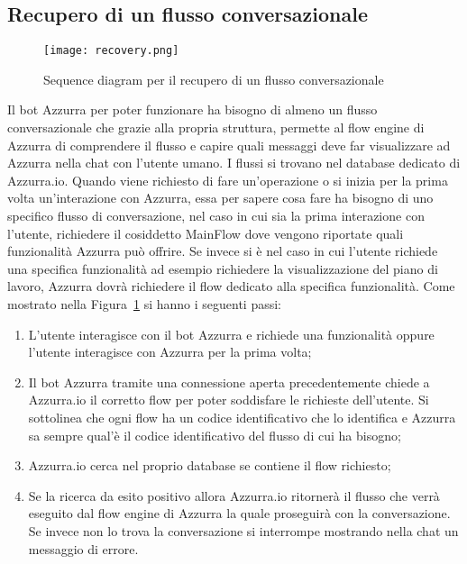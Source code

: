 \subsection{Recupero di un flusso conversazionale}
\begin{figure}[h]
	\begin{center}
		\texttt{[image: recovery.png]}
		\caption{Sequence diagram per il recupero di un flusso conversazionale}\label{fig:recovery}
	\end{center}
\end{figure}
Il bot Azzurra per poter funzionare ha bisogno di almeno un flusso conversazionale che grazie alla propria struttura, permette al flow engine di Azzurra di comprendere il flusso e capire quali messaggi deve far visualizzare ad Azzurra nella chat con l'utente umano. I flussi si trovano nel database dedicato di Azzurra.io. Quando viene richiesto di fare un’operazione o si inizia per la prima volta un'interazione con Azzurra, essa per sapere cosa fare ha bisogno di uno specifico flusso di conversazione, nel caso in cui sia la prima interazione con l'utente, richiedere il cosiddetto MainFlow dove vengono riportate quali funzionalità Azzurra può offrire. Se invece si è nel caso in cui l'utente richiede una specifica funzionalità ad esempio richiedere la visualizzazione del piano di lavoro, Azzurra dovrà richiedere il flow dedicato alla specifica funzionalità.
Come mostrato nella Figura~\ref{fig:recovery} si hanno i seguenti passi:
\begin{enumerate}
\item L'utente interagisce con il bot Azzurra e richiede una funzionalità oppure l'utente interagisce con Azzurra per la prima volta;
\item Il bot Azzurra tramite una connessione aperta precedentemente chiede a Azzurra.io il corretto flow per poter soddisfare le richieste dell'utente. Si sottolinea che ogni flow ha un codice identificativo che lo identifica e Azzurra sa sempre qual'è il codice identificativo del flusso di cui ha bisogno;
\item Azzurra.io cerca nel proprio database se contiene il flow richiesto;
\item Se la ricerca da esito positivo allora Azzurra.io ritornerà il flusso che verrà eseguito dal flow engine di Azzurra la quale proseguirà con la conversazione. Se invece non lo trova la conversazione si interrompe mostrando nella chat un messaggio di errore.
\end{enumerate}

